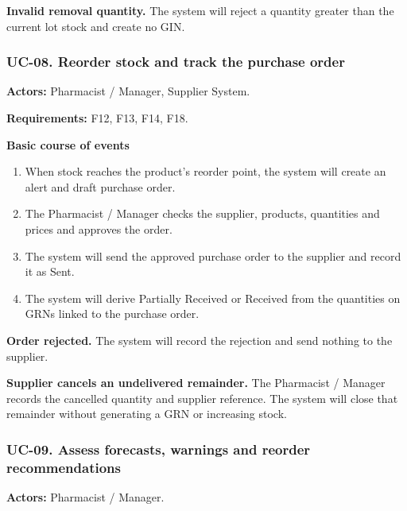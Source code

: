 \textbf{Invalid removal quantity.} The system will reject a quantity greater than the current lot stock and create no GIN.


\clearpage
\subsubsection*{UC-08. Reorder stock and track the purchase order}
\textbf{Actors:} Pharmacist / Manager, Supplier System.

\textbf{Requirements:} F12, F13, F14, F18.

\textbf{Basic course of events}
\begin{enumerate}
\item When stock reaches the product's reorder point, the system will create an alert and draft purchase order.
\item The Pharmacist / Manager checks the supplier, products, quantities and prices and approves the order.
\item The system will send the approved purchase order to the supplier and record it as Sent.
\item The system will derive Partially Received or Received from the quantities on GRNs linked to the purchase order.
\end{enumerate}

\textbf{Order rejected.} The system will record the rejection and send nothing to the supplier.

\textbf{Supplier cancels an undelivered remainder.} The Pharmacist / Manager records the cancelled quantity and supplier reference. The system will close that remainder without generating a GRN or increasing stock.


\clearpage
\subsubsection*{UC-09. Assess forecasts, warnings and reorder recommendations}
\textbf{Actors:} Pharmacist / Manager.

